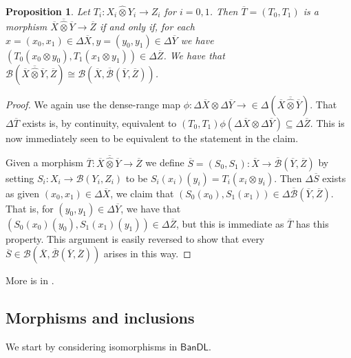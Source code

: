 \documentclass[a4paper,11pt]{article}
\theoremstyle{plain}
\newtheorem{proposition}{Proposition}[section]
\theoremstyle{remark}
\newcommand{\mc}[1]{\mathcal{#1}}
\newcommand{\msf}[1]{\mathsf{#1}}
\newcommand{\proten}{\widehat\otimes}
\begin{document}
\begin{proposition}\label{prop:tensor_adjoint_hom}
Let $T_i \colon X_i\proten Y_i \to Z_i$ for $i=0,1$.  Then $\overline T=(T_0,T_1)$ is a morphism $\overline X\overline\proten\overline Y \to \overline Z$ if and only if, for each $x=(x_0,x_1)\in\Delta\overline X, y=(y_0,y_1)\in\Delta\overline Y$ we have $(T_0(x_0\otimes y_0), T_1(x_1\otimes y_1)) \in \Delta\overline Z$.  We have that $\mc B(\overline X\overline\proten\overline Y, \overline Z) \cong \mc B(\overline X, \overline{\mc B}(\overline Y,\overline Z))$.
\end{proposition}
\begin{proof}
We again use the dense-range map $\phi \colon \Delta\overline X \otimes \Delta\overline Y \to \in\Delta(\overline X\overline\proten\overline Y)$.  That $\Delta\overline T$ exists is, by continuity, equivalent to $(T_0,T_1)\phi(\Delta\overline X \otimes \Delta\overline Y) \subseteq \Delta\overline Z$.  This is now immediately seen to be equivalent to the statement in the claim.

Given a morphism $\overline T\colon \overline X\overline\proten\overline Y \to \overline Z$ we define $\overline S=(S_0,S_1) \colon \overline X \to \overline{\mc B}(\overline Y,\overline Z)$ by setting $S_i \colon X_i \to \mc B(Y_i, Z_i)$ to be $S_i(x_i)(y_i) = T_i(x_i\otimes y_i)$.  Then $\Delta\overline S$ exists as given $(x_0,x_1)\in\Delta\overline X$, we claim that $(S_0(x_0), S_1(x_1)) \in \Delta \overline{\mc B}(\overline Y,\overline Z)$.  That is, for $(y_0,y_1)\in\Delta\overline Y$, we have that $(S_0(x_0)(y_0), S_1(x_1)(y_1))\in\Delta\overline Z$, but this is immediate as $\overline T$ has this property.  This argument is easily reversed to show that every $\overline S \in \mc B(\overline X, \overline{\mc B}(\overline Y,\overline Z))$ arises in this way.
\end{proof}

More is in \cite[Section IV.2]{KP_InterpolationFunctorsDuality}.



\subsection{Morphisms and inclusions}

We start by considering isomorphisms in $\msf{BanDL}$.
\end{document}
